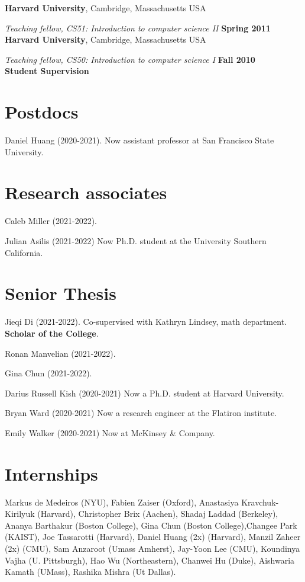\documentclass[margin,line]{res}
\begin{document}
\begin{resume}
{\bf Harvard University}, Cambridge, Massachusetts USA
\vspace{-.4cm}

{\em Teaching fellow, CS51: Introduction to computer science II} \hfill {\bf Spring 2011}\\
{\bf Harvard University}, Cambridge, Massachusetts USA

\vspace{-.4cm}
{\em Teaching fellow, CS50: Introduction to computer science I} \hfill {\bf Fall 2010}\\


\newpage
  {\bf {\Large Student Supervision}}

\section{\sc Postdocs}

Daniel Huang (2020-2021). \hfill Now assistant professor at San Francisco State University.

\section{\sc Research associates}

Caleb Miller (2021-2022).

Julian Asilis (2021-2022) \hfill Now Ph.D. student at the University Southern California.

\section{\sc Senior Thesis}

Jieqi Di (2021-2022). Co-supervised with Kathryn Lindsey, math department. {\bf Scholar of the College}.

Ronan Manvelian (2021-2022).

Gina Chun (2021-2022).

Darius Russell Kish (2020-2021) \hfill Now a Ph.D. student at Harvard University.

Bryan Ward (2020-2021) \hfill Now a research engineer at the Flatiron institute.

Emily Walker (2020-2021) \hfill Now at McKinsey \& Company.

\section{\sc Internships}

Markus de Medeiros (NYU), Fabien Zaiser (Oxford), Anastasiya
Kravchuk-Kirilyuk (Harvard), Christopher Brix (Aachen), Shadaj Laddad
(Berkeley), Ananya Barthakur (Boston College), Gina Chun (Boston
College),Changee Park (KAIST), Joe Tassarotti (Harvard), Daniel Huang
(2x) (Harvard), Manzil Zaheer (2x) (CMU), Sam Anzaroot (Umass
Amherst), Jay-Yoon Lee (CMU), Koundinya Vajha (U. Pittsburgh), Hao Wu
(Northeastern), Chanwei Hu (Duke), Aishwaria Kamath (UMass), Rashika
Mishra (Ut Dallas).


\end{resume}
\end{document}
